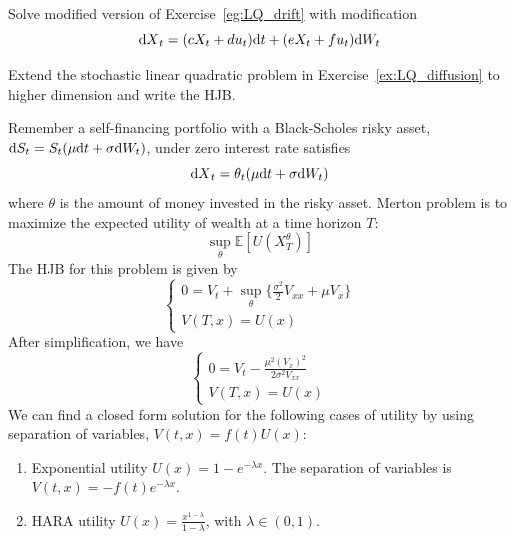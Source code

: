 \documentclass[11pt]{book}
\newcommand{\dd}{\text{\normalfont d}}
\newcommand{\dt}{\text{\normalfont d}t}
\newcommand{\dX}{\text{\normalfont d}X}
\newcommand{\dW}{\text{\normalfont d}W}
\begin{document}
\begin{ex}\label{ex:LQ_diffusion}
Solve modified version of Exercise~\ref{eg:LQ_drift} with modification 
\begin{equation}
        {\dX}_t=(cX_t+du_t){\dt}+(eX_t+fu_t) \dW_t
    \end{equation}
\end{ex}
\begin{ex}
    Extend the stochastic linear quadratic problem in Exercise~\ref{ex:LQ_diffusion} to higher dimension and write the HJB.
\end{ex}
\begin{eg}
    {}
    Remember a self-financing portfolio with a 
    Black-Scholes risky asset, 
    ${{\dd}}S_t=S_t(\mu {\dt}+\sigma \dW_t)$, 
    under zero interest rate  satisfies
    \begin{equation}
        {\dX}_t=\theta_t(\mu {\dt}+ \sigma \dW_t)
    \end{equation}
    where $\theta$ is the amount of money invested in the risky asset.
    Merton problem is to maximize the expected utility of wealth at a time horizon $T$:
    \begin{equation}
        \sup_{\theta}\mathbb{E}[U(X_T^\theta)]
    \end{equation}
    The HJB for this problem is given by 
    \begin{equation}
        \begin{cases}
            0={V}_{t} + \sup_{\theta}\Big\{
            \frac{\sigma^2}{2}V_{xx} +\mu  V_{x}\Big\}\\
            V(T,x)=U(x)
        \end{cases}
    \end{equation}
    After simplification, we have 
        \begin{equation}
        \begin{cases}
            0={V}_{t} -\frac{\mu^2 ( V_{x})^2}{2\sigma^2V_{xx}}\\
            V(T,x)=U(x)
        \end{cases}
    \end{equation}
    We can find a closed form solution for the following cases of utility by using separation of variables, $V(t,x)=f(t)U(x)$:
    \begin{enumerate}
        \item Exponential utility $U(x)=1-e^{-\lambda x}$. The separation of variables is $V(t,x)=-f(t)e^{-\lambda x}$.
        \item HARA utility $U(x)=\frac{x^{1-\lambda}}{1-\lambda}$, with $\lambda\in(0,1)$.
    \end{enumerate}
\end{eg}
\end{document}

